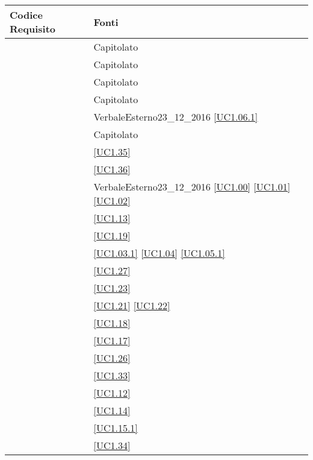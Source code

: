 \begin{longtable}{|P{6cm}|P{6cm}|}
	\hline \textbf{Codice Requisito} & \textbf{Fonti}\\
	\hline {} & Capitolato \\
	\hline {} & Capitolato \\
	\hline {} & Capitolato \\
	\hline {} & Capitolato \\
	\hline {} & VerbaleEsterno23\_12\_2016 \linebreak \ref{UC1.06.1}  \\	
	\hline {} & Capitolato \\
	\hline {} & \ref{UC1.35} \\
	\hline {} & \ref{UC1.36} \\
	\hline {} & VerbaleEsterno23\_12\_2016 \linebreak \ref{UC1.00} \linebreak \ref{UC1.01} \linebreak \ref{UC1.02} \\
	\hline {} & \ref{UC1.13} \\
	\hline {} & \ref{UC1.19} \\
	\hline {} & \ref{UC1.03.1} \linebreak \ref{UC1.04} \linebreak \ref{UC1.05.1} \\
	\hline {} & \ref{UC1.27} \\
	\hline {} & \ref{UC1.23} \\
	\hline {} & \ref{UC1.21} \linebreak \ref{UC1.22} \\
	\hline {} & \ref{UC1.18} \\
	\hline {} & \ref{UC1.17} \\
	\hline {} & \ref{UC1.26} \\
	\hline {} & \ref{UC1.33} \\
	\hline {} & \ref{UC1.12} \\
	\hline {} & \ref{UC1.14} \\
	\hline {} & \ref{UC1.15.1} \\
	\hline {} & \ref{UC1.34} \\

\end{longtable}
